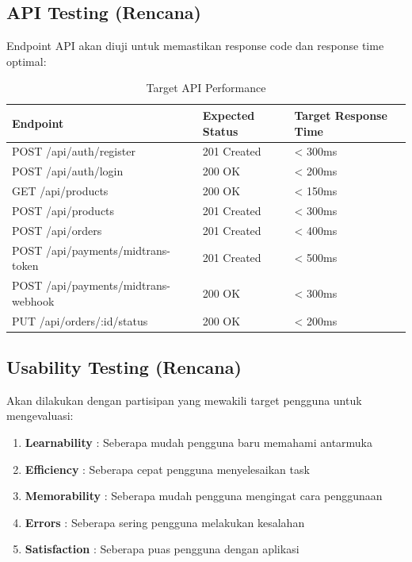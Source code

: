 \subsection{API Testing (Rencana)}

Endpoint API akan diuji untuk memastikan response code dan response time optimal:

\begin{table}[htbp]
\centering
\caption{Target API Performance}
\label{tab:api_testing}
\begin{tabularx}{\textwidth}{|l|X|X|}
\hline
\textbf{Endpoint} & \textbf{Expected Status} & \textbf{Target Response Time} \\
\hline
POST /api/auth/register & 201 Created & < 300ms \\
\hline
POST /api/auth/login & 200 OK & < 200ms \\
\hline
GET /api/products & 200 OK & < 150ms \\
\hline
POST /api/products & 201 Created & < 300ms \\
\hline
POST /api/orders & 201 Created & < 400ms \\
\hline
POST /api/payments/midtrans-token & 201 Created & < 500ms \\
\hline
POST /api/payments/midtrans-webhook & 200 OK & < 300ms \\
\hline
PUT /api/orders/:id/status & 200 OK & < 200ms \\
\hline
\end{tabularx}
\end{table}

\subsection{Usability Testing (Rencana)}

Akan dilakukan dengan partisipan yang mewakili target pengguna untuk mengevaluasi:

\begin{enumerate}[leftmargin=*]
    \item \textbf{Learnability} : Seberapa mudah pengguna baru memahami antarmuka
    \item \textbf{Efficiency} : Seberapa cepat pengguna menyelesaikan task
    \item \textbf{Memorability} : Seberapa mudah pengguna mengingat cara penggunaan
    \item \textbf{Errors} : Seberapa sering pengguna melakukan kesalahan
    \item \textbf{Satisfaction} : Seberapa puas pengguna dengan aplikasi
\end{enumerate}

